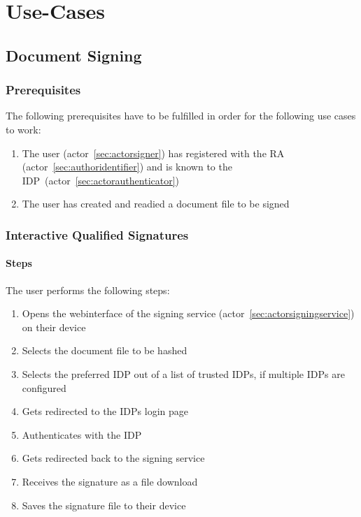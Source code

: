 \chapter{Use-Cases}\label{ch:usecases}

\section{Document Signing}\label{sec:document-signing}

\subsection{Prerequisites}\label{subsec:prerequisites}
The following prerequisites have to be fulfilled in order for the following use cases to work:
\begin{enumerate}
    \item The user (actor~\ref{sec:actorsigner}) has registered with the \gls{RA} (actor~\ref{sec:authoridentifier}) and is known to the \gls{IDP}~(actor~\ref{sec:actorauthenticator})
    \item The user has created and readied a document file to be signed
\end{enumerate}

\subsection{Interactive Qualified Signatures}\label{subsec:interactive-qualified-signatures}
\subsubsection{Steps}
The user performs the following steps:
\begin{enumerate}
    \item Opens the webinterface of the signing service (actor~\ref{sec:actorsigningservice}) on their device
    \item Selects the document file to be hashed
    \item Selects the preferred \gls{IDP} out of a list of trusted \gls{IDP}s, if multiple \gls{IDP}s are configured
    \item Gets redirected to the \gls{IDP}s login page
    \item Authenticates with the \gls{IDP}
    \item Gets redirected back to the signing service
    \item Receives the signature as a file download
    \item Saves the signature file to their device
\end{enumerate}

